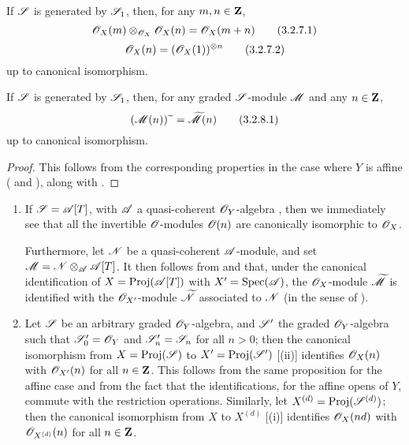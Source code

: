\begin{corollary}[3.2.7]
\label{II.3.2.7}
If $\mathscr{S}$ is generated by $\mathscr{S}_1$, then, for any $m,n\in\mathbf{Z}$,
\[
\label{II.3.2.7.1}
  \mathscr{O}_X(m)\otimes_{\mathscr{O}_X}\mathscr{O}_X(n) = \mathscr{O}_X(m+n)
\tag{3.2.7.1}
\]
\[
\label{II.3.2.7.2}
  \mathscr{O}_X(n) = (\mathscr{O}_X(1))^{\otimes n}
\tag{3.2.7.2}
\]
up to canonical isomorphism.
\end{corollary}


\begin{corollary}[3.2.8]
\label{II.3.2.8}
If $\mathscr{S}$ is generated by $\mathscr{S}_1$, then, for any graded $\mathscr{S}$-module $\mathscr{M}$ and any $n\in\mathbf{Z}$,
\[
\label{II.3.2.8.1}
  (\mathscr{M}(n)){\,\widetilde{\,}\,} = \widetilde{\mathscr{M}}(n)
\tag{3.2.8.1}
\]
up to canonical isomorphism.
\end{corollary}

\begin{proof}
This follows from the corresponding properties in the case where $Y$ is affine ( and ), along with .
\end{proof}

\begin{remarks}[3.2.9]
\label{II.3.2.9}
\medskip\noindent
  \begin{enumerate}
    \item If $\mathscr{S}=\mathscr{A}[T]$, with $\mathscr{A}$ a quasi-coherent $\mathscr{O}_Y$-algebra , then we immediately see that all the invertible $\mathscr{O}$-modules $\mathscr{O}(n)$ are canonically isomorphic to $\mathscr{O}_X$.

      Furthermore, let $\mathscr{N}$ be a quasi-coherent $\mathscr{A}$-module, and set $\mathscr{M}=\mathscr{N}\otimes_{\mathscr{A}}\mathscr{A}[T]$.
      It then follows from  and  that, under the canonical identification of $X=\operatorname{Proj}(\mathscr{A}[T])$ with $X'=\operatorname{Spec}(\mathscr{A})$, the $\mathscr{O}_X$-module $\widetilde{\mathscr{M}}$ is identified with the $\mathscr{O}_{X'}$-module $\widetilde{\mathscr{N}}$ associated to $\mathscr{N}$ (in the sense of ).
    \item Let $\mathscr{S}$ be an arbitrary graded $\mathscr{O}_Y$-algebra, and $\mathscr{S}'$ the graded $\mathscr{O}_Y$-algebra such that $\mathscr{S}'_0=\mathscr{O}_Y$ and $\mathscr{S}'_n=\mathscr{S}_n$ for all $n>0$;
      then the canonical isomorphism from $X=\operatorname{Proj}(\mathscr{S})$ to $X'=\operatorname{Proj}(\mathscr{S}')$ [(ii)] identifies $\mathscr{O}_X(n)$ with $\mathscr{O}_{X'}(n)$ for all $n\in\mathbf{Z}$.
      This follows from the same proposition for the affine case  and from the fact that the identifications, for the affine opens of $Y$, commute with the restriction operations.
      Similarly, let $X^{(d)}=\operatorname{Proj}(\mathscr{S}^{(d)})$;
      then the canonical isomorphism from $X$ to $X^{(d)}$ [(i)] identifies $\mathscr{O}_X(nd)$ with $\mathscr{O}_{X^{(d)}}(n)$ for all $n\in\mathbf{Z}$.
  \end{enumerate}
\end{remarks}

